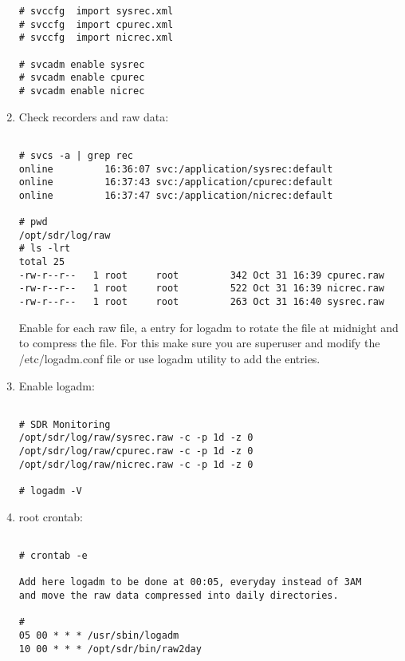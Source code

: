 \begin{enumerate}
\begin{Verbatim}[fontsize=\relsize{-2},frame=single,
                 label=\fbox{SMF Manifests},
                 framesep=3mm,labelposition=bottomline]
# svccfg  import sysrec.xml
# svccfg  import cpurec.xml                        
# svccfg  import nicrec.xml                        

# svcadm enable sysrec
# svcadm enable cpurec
# svcadm enable nicrec                             

\end{Verbatim}

\item Check recorders and raw data:

\begin{Verbatim}[fontsize=\relsize{-2},frame=single,
                 label=\fbox{Pre-check},
                 framesep=3mm,labelposition=bottomline]

# svcs -a | grep rec
online         16:36:07 svc:/application/sysrec:default
online         16:37:43 svc:/application/cpurec:default
online         16:37:47 svc:/application/nicrec:default

# pwd
/opt/sdr/log/raw
# ls -lrt
total 25
-rw-r--r--   1 root     root         342 Oct 31 16:39 cpurec.raw
-rw-r--r--   1 root     root         522 Oct 31 16:39 nicrec.raw
-rw-r--r--   1 root     root         263 Oct 31 16:40 sysrec.raw

\end{Verbatim}

\noindent
Enable for each raw file, a entry for logadm to rotate the file
at midnight and to compress the file. For this make sure you are
superuser and modify the /etc/logadm.conf file or use logadm
utility to add the entries.

\item Enable logadm:

\begin{Verbatim}[fontsize=\relsize{-2},frame=single,
                 label=\fbox{Logadm},
                 framesep=3mm,labelposition=bottomline]

# SDR Monitoring
/opt/sdr/log/raw/sysrec.raw -c -p 1d -z 0
/opt/sdr/log/raw/cpurec.raw -c -p 1d -z 0
/opt/sdr/log/raw/nicrec.raw -c -p 1d -z 0

# logadm -V 
\end{Verbatim}


\item root crontab:

\begin{Verbatim}[fontsize=\relsize{-2},frame=single,
                 label=\fbox{crontab},
                 framesep=3mm,labelposition=bottomline]

# crontab -e

Add here logadm to be done at 00:05, everyday instead of 3AM
and move the raw data compressed into daily directories.

#
05 00 * * * /usr/sbin/logadm
10 00 * * * /opt/sdr/bin/raw2day

\end{Verbatim}

\end{enumerate}




